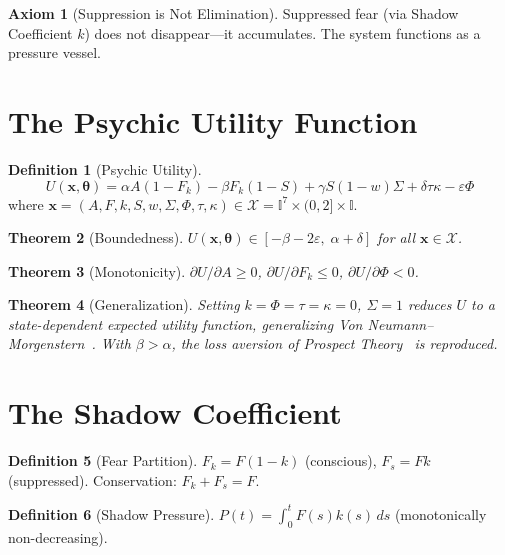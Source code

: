 \documentclass[12pt,a4paper,twoside]{article}
\theoremstyle{plain}
\newtheorem{theorem}{Theorem}[section]
\theoremstyle{definition}
\newtheorem{definition}[theorem]{Definition}
\newtheorem{axiom}{Axiom}
\theoremstyle{remark}
\newcommand{\I}{\mathbb{I}}
\newcommand{\X}{\mathcal{X}}
\newcommand{\Fk}{F_k}
\newcommand{\Fs}{F_s}
\newcommand{\bx}{\mathbf{x}}
\newcommand{\btheta}{\boldsymbol{\theta}}
\begin{document}
\begin{axiom}[Suppression is Not Elimination]
Suppressed fear (via Shadow Coefficient $k$) does not disappear---it accumulates. The system functions as a pressure vessel.
\end{axiom}

\section{The Psychic Utility Function}

\begin{definition}[Psychic Utility]
\begin{equation}\label{eq:U}
\boxed{U(\bx, \btheta) = \alpha A(1-\Fk) - \beta \Fk(1-S) + \gamma S(1-w)\Sigma + \delta\tau\kappa - \varepsilon\Phi}
\end{equation}
where $\bx = (A, F, k, S, w, \Sigma, \Phi, \tau, \kappa) \in \X = \I^7 \times (0,2] \times \I$.
\end{definition}

\begin{theorem}[Boundedness]
$U(\bx, \btheta) \in [-\beta - 2\varepsilon,\; \alpha + \delta]$ for all $\bx \in \X$.
\end{theorem}

\begin{theorem}[Monotonicity]
$\partial U/\partial A \geq 0$, $\partial U/\partial \Fk \leq 0$, $\partial U/\partial \Phi < 0$.
\end{theorem}

\begin{theorem}[Generalization]
Setting $k = \Phi = \tau = \kappa = 0$, $\Sigma = 1$ reduces $U$ to a state-dependent expected utility function, generalizing Von Neumann--Morgenstern~\citep{vonnm1944}. With $\beta > \alpha$, the loss aversion of Prospect Theory~\citep{kahneman1979} is reproduced.
\end{theorem}


\section{The Shadow Coefficient}

\begin{definition}[Fear Partition]
$\Fk = F(1-k)$ (conscious), $\Fs = Fk$ (suppressed). Conservation: $\Fk + \Fs = F$.
\end{definition}

\begin{definition}[Shadow Pressure]
$P(t) = \int_0^t F(s)k(s)\,ds$ (monotonically non-decreasing).
\end{definition}
\end{document}
